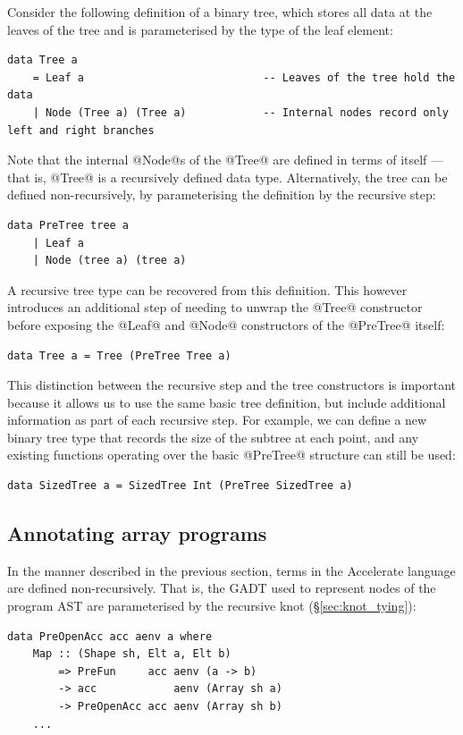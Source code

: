 Consider the following definition of a binary tree, which stores all data at the
leaves of the tree and is parameterised by the type of the leaf element:
%
\begin{lstlisting}[style=haskell]
data Tree a
    = Leaf a                            -- Leaves of the tree hold the data
    | Node (Tree a) (Tree a)            -- Internal nodes record only left and right branches
\end{lstlisting}
%
Note that the internal @Node@s of the @Tree@ are defined in terms of
itself --- that is, @Tree@ is a recursively defined data type.
Alternatively, the tree can be defined non-recursively, by parameterising the
definition by the recursive step:
%
\begin{lstlisting}[style=haskell]
data PreTree tree a
    | Leaf a
    | Node (tree a) (tree a)
\end{lstlisting}
%
A recursive tree type can be recovered from this definition. This however
introduces an additional step of needing to unwrap the @Tree@ constructor before
exposing the @Leaf@ and @Node@ constructors of the @PreTree@ itself:
%
\begin{lstlisting}[style=haskell,firstnumber=4]
data Tree a = Tree (PreTree Tree a)
\end{lstlisting}

This distinction between the recursive step and the tree constructors is
important because it allows us to use the same basic tree definition, but
include additional information as part of each recursive step. For example, we
can define a new binary tree type that records the size of the subtree at each
point, and any existing functions operating over the basic @PreTree@ structure
can still be used:
%
\begin{lstlisting}[style=haskell,firstnumber=5]
data SizedTree a = SizedTree Int (PreTree SizedTree a)
\end{lstlisting}


\subsection{Annotating array programs}
\label{sec:annotating_array_programs}

In the manner described in the previous section, terms in the Accelerate
language are defined non-recursively. That is, the GADT used to represent nodes
of the program AST are parameterised by the recursive knot
(\S\ref{sec:knot_tying}):
%
\begin{lstlisting}[style=haskell]
data PreOpenAcc acc aenv a where
    Map :: (Shape sh, Elt a, Elt b)
        => PreFun     acc aenv (a -> b)
        -> acc            aenv (Array sh a)
        -> PreOpenAcc acc aenv (Array sh b)
    ...
\end{lstlisting}

